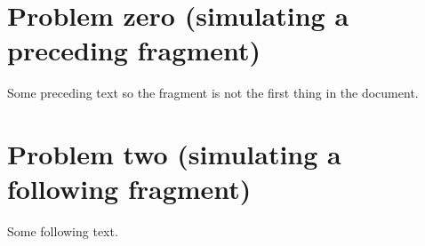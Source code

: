\documentclass[11pt]{article}
\begin{document}
\section*{Problem zero (simulating a preceding fragment)}
Some preceding text so the fragment is not the first thing in the document.

\section*{Problem two (simulating a following fragment)}
Some following text.
\end{document}
